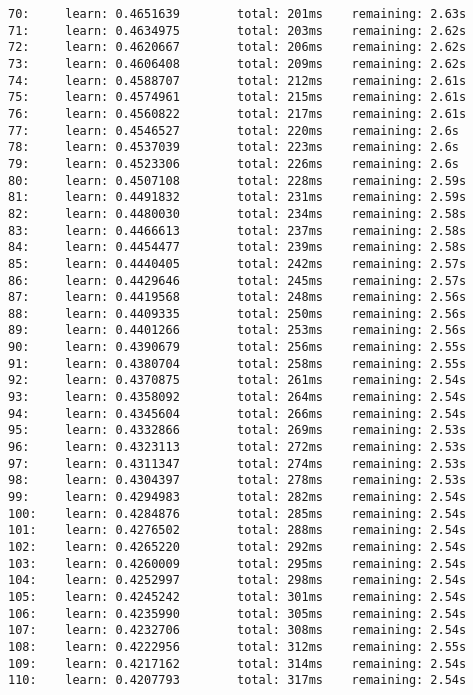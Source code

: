 \documentclass[11pt]{article}
\begin{document}
\begin{Verbatim}[commandchars=\\\{\}]
70:     learn: 0.4651639        total: 201ms    remaining: 2.63s
71:     learn: 0.4634975        total: 203ms    remaining: 2.62s
72:     learn: 0.4620667        total: 206ms    remaining: 2.62s
73:     learn: 0.4606408        total: 209ms    remaining: 2.62s
74:     learn: 0.4588707        total: 212ms    remaining: 2.61s
75:     learn: 0.4574961        total: 215ms    remaining: 2.61s
76:     learn: 0.4560822        total: 217ms    remaining: 2.61s
77:     learn: 0.4546527        total: 220ms    remaining: 2.6s
78:     learn: 0.4537039        total: 223ms    remaining: 2.6s
79:     learn: 0.4523306        total: 226ms    remaining: 2.6s
80:     learn: 0.4507108        total: 228ms    remaining: 2.59s
81:     learn: 0.4491832        total: 231ms    remaining: 2.59s
82:     learn: 0.4480030        total: 234ms    remaining: 2.58s
83:     learn: 0.4466613        total: 237ms    remaining: 2.58s
84:     learn: 0.4454477        total: 239ms    remaining: 2.58s
85:     learn: 0.4440405        total: 242ms    remaining: 2.57s
86:     learn: 0.4429646        total: 245ms    remaining: 2.57s
87:     learn: 0.4419568        total: 248ms    remaining: 2.56s
88:     learn: 0.4409335        total: 250ms    remaining: 2.56s
89:     learn: 0.4401266        total: 253ms    remaining: 2.56s
90:     learn: 0.4390679        total: 256ms    remaining: 2.55s
91:     learn: 0.4380704        total: 258ms    remaining: 2.55s
92:     learn: 0.4370875        total: 261ms    remaining: 2.54s
93:     learn: 0.4358092        total: 264ms    remaining: 2.54s
94:     learn: 0.4345604        total: 266ms    remaining: 2.54s
95:     learn: 0.4332866        total: 269ms    remaining: 2.53s
96:     learn: 0.4323113        total: 272ms    remaining: 2.53s
97:     learn: 0.4311347        total: 274ms    remaining: 2.53s
98:     learn: 0.4304397        total: 278ms    remaining: 2.53s
99:     learn: 0.4294983        total: 282ms    remaining: 2.54s
100:    learn: 0.4284876        total: 285ms    remaining: 2.54s
101:    learn: 0.4276502        total: 288ms    remaining: 2.54s
102:    learn: 0.4265220        total: 292ms    remaining: 2.54s
103:    learn: 0.4260009        total: 295ms    remaining: 2.54s
104:    learn: 0.4252997        total: 298ms    remaining: 2.54s
105:    learn: 0.4245242        total: 301ms    remaining: 2.54s
106:    learn: 0.4235990        total: 305ms    remaining: 2.54s
107:    learn: 0.4232706        total: 308ms    remaining: 2.54s
108:    learn: 0.4222956        total: 312ms    remaining: 2.55s
109:    learn: 0.4217162        total: 314ms    remaining: 2.54s
110:    learn: 0.4207793        total: 317ms    remaining: 2.54s

\end{Verbatim}
\end{document}
